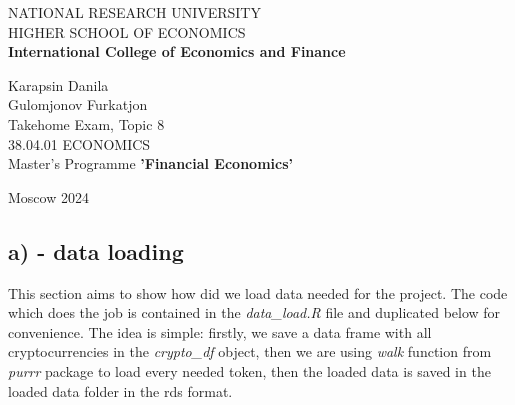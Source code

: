 \documentclass[
]{article}
\author{}
\date{\vspace{-2.5em}}
\begin{document}
\allsectionsfont{\centering}
\subsectionfont{\raggedright}
\subsubsectionfont{\raggedright}


\begin{centering}

\vspace{3cm}

\vspace{1cm}

\Large
{NATIONAL RESEARCH UNIVERSITY \\ HIGHER SCHOOL OF ECONOMICS}
\normalsize
\\
{\bf International College of Economics and Finance}
\vspace{1cm}


\Large
\doublespacing
Karapsin Danila\\
Gulomjonov Furkatjon\\
\normalsize
Takehome Exam, Topic 8\\
38.04.01 ECONOMICS\\
Master's Programme {\bf 'Financial Economics'}

\vspace{1 cm}

\normalsize
\singlespacing


\mbox{}
\vfill
\normalsize
Moscow 2024

\end{centering}

\newpage

\setcounter{page}{2}

\tableofcontents

\newpage

\subsection{a) - data loading}\label{a---data-loading}

This section aims to show how did we load data needed for the project.
The code which does the job is contained in the \emph{data\_load.R} file
and duplicated below for convenience. The idea is simple: firstly, we
save a data frame with all cryptocurrencies in the \emph{crypto\_df}
object, then we are using \emph{walk} function from \emph{purrr} package
to load every needed token, then the loaded data is saved in the loaded
data folder in the rds format.
\end{document}
